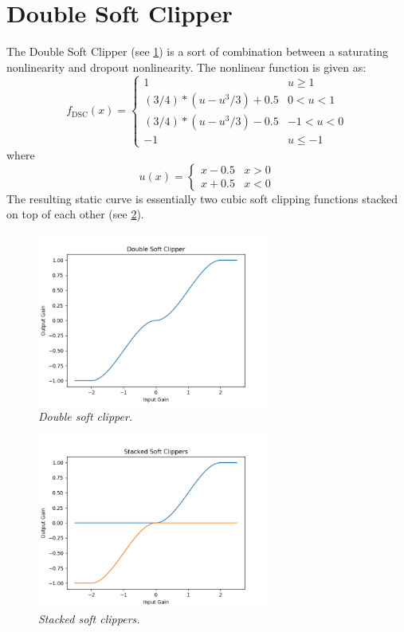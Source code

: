 \documentclass[twoside,a4paper]{article}
\begin{document}
\section{Double Soft Clipper} \label{sec:DSC}
%
The Double Soft Clipper (see \cref{DSC}) is a sort of
combination between a saturating nonlinearity and dropout
nonlinearity. The nonlinear function is given as:
%
\begin{equation}
    f_{\text{DSC}}(x) = \begin{cases}
        1 & u \geq 1 \\
        (3/4) * (u - u^3/3) + 0.5 & 0 < u < 1 \\
        (3/4) * (u - u^3/3) - 0.5 & -1 < u < 0 \\
        -1 & u \leq -1
    \end{cases}
    \label{eq:double-soft-clip}
\end{equation}
%
where
%
\begin{equation}
    u(x) = \begin{cases}
    x - 0.5 & x > 0 \\
    x + 0.5 & x < 0
    \end{cases}
    \label{eq:double-soft-clip_u}
\end{equation}
%
The resulting static curve is essentially two cubic soft
clipping functions stacked on top of each other (see \cref{DSC-stack}).
%
\begin{figure}[h]
    \center
    \includegraphics[width=3in]{../DoubleSoftClipper/Pics/Double.png}
    \caption{\label{DSC}{\it Double soft clipper.}}
\end{figure}
%
\begin{figure}[h]
    \center
    \includegraphics[width=3in]{../DoubleSoftClipper/Pics/stacked.png}
    \caption{\label{DSC-stack}{\it Stacked soft clippers.}}
\end{figure}
\end{document}
